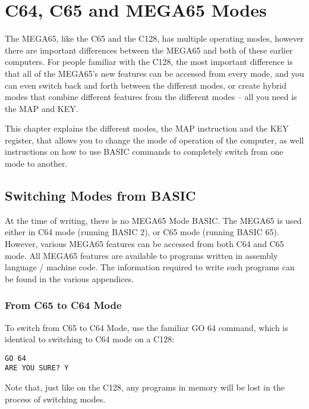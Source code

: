 \chapter {C64, C65 and MEGA65 Modes}
\label{cha:modes}

The MEGA65, like the C65 and the C128, has multiple operating modes,
however there are important differences between the MEGA65 and both
of these earlier computers.  For people familiar with the C128,
the most important difference is that all of the MEGA65's new features
can be accessed from every mode, and you can even switch back and forth
between the different modes, or create hybrid modes that combine different
features from the different modes -- all you need is the MAP and KEY.

This chapter explains the different modes, the MAP instruction and
the KEY register, that allows you to change the mode of operation of the computer,
as well instructions on how to use BASIC commands to completely switch
from one mode to another.

\section{Switching Modes from BASIC}

At the time of writing, there is no MEGA65 Mode BASIC. The MEGA65 is used either
in C64 mode (running BASIC 2), or C65 mode (running BASIC 65).  However, various MEGA65
features can be accessed from both C64 and C65 mode.  All MEGA65 features are available
to programs written in assembly language / machine code.  The information required
to write such programs can be found in the various appendices.

\subsection{From C65 to C64 Mode}

To switch from C65 to C64 Mode, use the familiar GO 64 command, which is identical to switching to C64
mode on a C128:

\begin{tcolorbox}[colback=black,coltext=white]
\verbatimfont{\codefont}
\begin{verbatim}
GO 64
ARE YOU SURE? Y
\end{verbatim}
\end{tcolorbox}

Note that, just like on the C128, any programs in memory will be lost in the process of switching modes.

